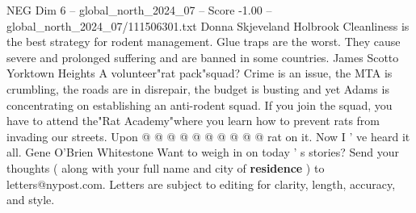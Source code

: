 \begin{textsample}{NEG Dim 6 – global\_north\_2024\_07 – Score -1.00 – global\_north\_2024\_07/111506301.txt}
Donna Skjeveland Holbrook Cleanliness is the best strategy for rodent management.
Glue traps are the worst.
They cause severe and prolonged suffering and are banned in some countries.
James Scotto Yorktown Heights A volunteer"rat pack"squad?
Crime is an issue, the MTA is crumbling, the roads are in disrepair, the budget is busting and yet Adams is concentrating on establishing an anti-rodent squad.
If you join the squad, you have to attend the"Rat Academy"where you learn how to prevent rats from invading our streets.
Upon @ @ @ @ @ @ @ @ @ @ rat on it.
Now I ' ve heard it all.
Gene O'Brien Whitestone Want to weigh in on today ' s stories?
Send your thoughts ( along with your full name and city of \textbf{residence} ) to letters@nypost.com.
Letters are subject to editing for clarity, length, accuracy, and style.

\end{textsample}
